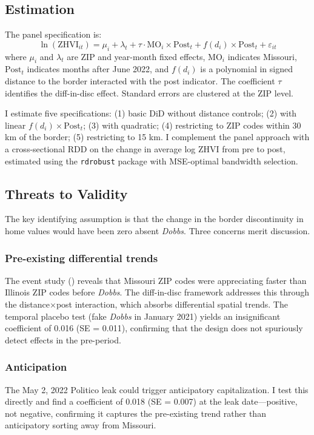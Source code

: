 \documentclass[12pt]{article}
\begin{document}
\subsection{Estimation}

The panel specification is:
\begin{equation}
\ln(\text{ZHVI}_{it}) = \mu_i + \lambda_t + \tau \cdot \text{MO}_i \times \text{Post}_t + f(d_i) \times \text{Post}_t + \varepsilon_{it}
\label{eq:main}
\end{equation}
where $\mu_i$ and $\lambda_t$ are ZIP and year-month fixed effects, $\text{MO}_i$ indicates Missouri, $\text{Post}_t$ indicates months after June 2022, and $f(d_i)$ is a polynomial in signed distance to the border interacted with the post indicator. The coefficient $\tau$ identifies the diff-in-disc effect. Standard errors are clustered at the ZIP level.

I estimate five specifications: (1) basic DiD without distance controls; (2) with linear $f(d_i) \times \text{Post}_t$; (3) with quadratic; (4) restricting to ZIP codes within 30 km of the border; (5) restricting to 15 km. I complement the panel approach with a cross-sectional RDD on the change in average log ZHVI from pre to post, estimated using the \texttt{rdrobust} package \citep{cattaneo2020rdrobust} with MSE-optimal bandwidth selection.

\subsection{Threats to Validity}

The key identifying assumption is that the change in the border discontinuity in home values would have been zero absent \textit{Dobbs}. Three concerns merit discussion.

\subsubsection*{Pre-existing differential trends} The event study () reveals that Missouri ZIP codes were appreciating faster than Illinois ZIP codes before \textit{Dobbs}. The diff-in-disc framework addresses this through the distance$\times$post interaction, which absorbs differential spatial trends. The temporal placebo test (fake \textit{Dobbs} in January 2021) yields an insignificant coefficient of 0.016 (SE = 0.011), confirming that the design does not spuriously detect effects in the pre-period.

\subsubsection*{Anticipation} The May 2, 2022 Politico leak could trigger anticipatory capitalization. I test this directly and find a coefficient of 0.018 (SE = 0.007) at the leak date---positive, not negative, confirming it captures the pre-existing trend rather than anticipatory sorting away from Missouri.
\end{document}

